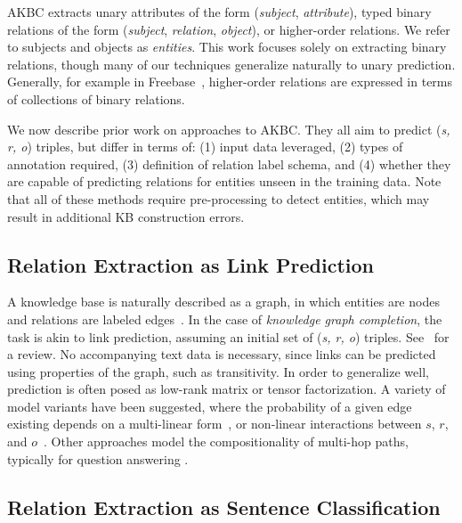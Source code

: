 AKBC extracts unary attributes of the form (\textit{subject}, \textit{attribute}), typed binary relations of the form (\textit{subject}, \textit{relation}, \textit{object}), or higher-order relations. We refer to subjects and objects as \textit{entities}. This work focuses solely on extracting binary relations, though many of our techniques generalize naturally to unary prediction. Generally, for example in Freebase~\citep{freebase}, higher-order relations are expressed in terms of collections of binary relations.

We now describe prior work on approaches to AKBC. They all aim to predict (\emph{s, r, o}) triples, but differ in terms of: (1) input data leveraged, (2) types of annotation required, (3) definition of relation label schema, and (4) whether they are capable of predicting relations for entities unseen in the training data. Note that all of these methods require pre-processing to detect entities, which may result in additional KB construction errors.

\subsection{Relation Extraction as Link Prediction \label{sec:prediction}}
A knowledge base is naturally described as a graph, in which entities are nodes and relations are labeled edges~\citep{yago,freebase}. In the case of \emph{knowledge graph completion}, the task is akin to link prediction, assuming an initial set of (\emph{s, r, o}) triples. See~\citet{nickel2015review} for a review. No accompanying text data is necessary, since links can be predicted using properties of the graph, such as transitivity. In order to generalize well, prediction is often posed as low-rank matrix or tensor factorization. A variety of model variants have been suggested, where the probability of a given edge existing depends on a multi-linear form~\citep{rescal,DBLP:journals/corr/Garcia-DuranBUG15,bishan,transe,wang2014knowledge,lin2015learning}, or non-linear interactions between $s$, $r$, and $o$~\citep{socherkb}.
Other approaches model the compositionality of multi-hop paths, typically for question answering \citep{bordes2014question,gu2015traversing,neelakantan2015compositional}.

\subsection{Relation Extraction as Sentence Classification
\label{seq:dist}}

